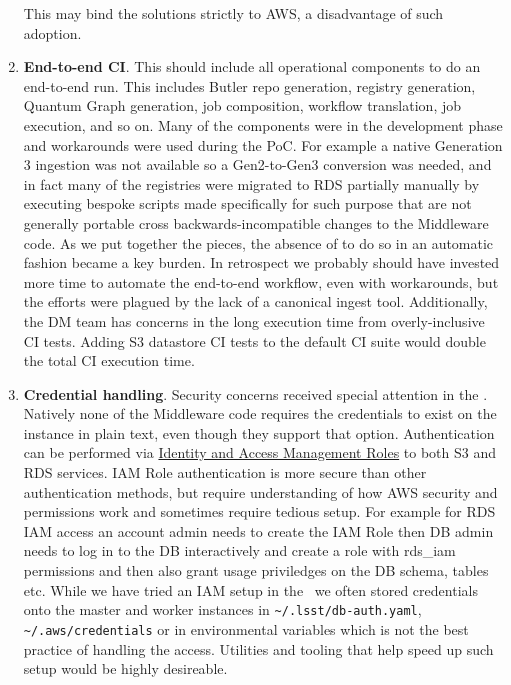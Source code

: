\begin{enumerate}
This may bind the solutions strictly to AWS, a disadvantage of such adoption.
\item \textbf{End-to-end CI}.
This should include all operational components to do an end-to-end run.
This includes Butler repo generation, registry generation, Quantum Graph generation, job composition, workflow translation, job execution, and so on.
Many of the components were in the development phase and workarounds were used during the PoC.
For example a native Generation 3 ingestion was not available so a Gen2-to-Gen3 conversion was needed, and in fact many of the registries were migrated to RDS partially manually by executing bespoke scripts made specifically for such purpose that are not generally portable cross backwards-incompatible changes to the Middleware code.
As we put together the pieces, the absence of to do so in an automatic fashion became a key burden.
In retrospect we probably should have invested more time to automate the end-to-end workflow, even with workarounds, but the efforts were plagued by the lack of a canonical ingest tool.
Additionally, the DM team has concerns in the long execution time from overly-inclusive CI tests.
Adding S3 datastore CI tests to the default CI suite would double the total CI execution time.
\item \textbf{Credential handling}.
Security concerns received special attention in the \poc.
Natively none of the Middleware code requires the credentials to exist on the instance in plain text, even though they support that option.
Authentication can be performed via \href{https://docs.aws.amazon.com/IAM/latest/UserGuide/id_roles.html}{Identity and Access Management Roles} to both S3 and RDS services.
IAM Role authentication is more secure than other authentication methods, but require understanding of how AWS security and permissions work and sometimes require tedious setup.
For example for RDS IAM access an account admin needs to create the IAM Role then DB admin needs to log in to the DB interactively and create a role with rds\_iam permissions and then also grant usage priviledges on the DB schema, tables etc.
While we have tried an IAM setup in the \poc~we often stored credentials onto the master and worker instances in \texttt{\~{}/.lsst/db-auth.yaml}, \texttt{\~{}/.aws/credentials} or in environmental variables which is not the best practice of handling the access.
Utilities and tooling that help speed up such setup would be highly desireable.


\end{enumerate}
